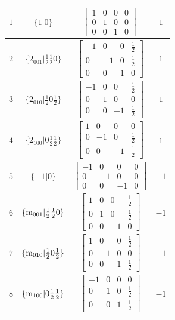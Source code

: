 \documentclass[fleqn,8pt]{jsarticle}
\begin{document}
\begin{longtable}{cccc}
$ 1 $ & $ \{1|0\} $ & $ \begin{bmatrix} 1 & 0 & 0 & 0 \\ 0 & 1 & 0 & 0 \\ 0 & 0 & 1 & 0 \end{bmatrix} $ & $ 1 $ \\ \hline
$ 2 $ & $ \{2{}_{001}|\frac{1}{2} \frac{1}{2} 0\} $ & $ \begin{bmatrix} -1 & 0 & 0 & \frac{1}{2} \\ 0 & -1 & 0 & \frac{1}{2} \\ 0 & 0 & 1 & 0 \end{bmatrix} $ & $ 1 $ \\ \hline
$ 3 $ & $ \{2{}_{010}|\frac{1}{2} 0 \frac{1}{2}\} $ & $ \begin{bmatrix} -1 & 0 & 0 & \frac{1}{2} \\ 0 & 1 & 0 & 0 \\ 0 & 0 & -1 & \frac{1}{2} \end{bmatrix} $ & $ 1 $ \\ \hline
$ 4 $ & $ \{2{}_{100}|0 \frac{1}{2} \frac{1}{2}\} $ & $ \begin{bmatrix} 1 & 0 & 0 & 0 \\ 0 & -1 & 0 & \frac{1}{2} \\ 0 & 0 & -1 & \frac{1}{2} \end{bmatrix} $ & $ 1 $ \\ \hline
$ 5 $ & $ \{-1|0\} $ & $ \begin{bmatrix} -1 & 0 & 0 & 0 \\ 0 & -1 & 0 & 0 \\ 0 & 0 & -1 & 0 \end{bmatrix} $ & $ -1 $ \\ \hline
$ 6 $ & $ \{{\rm m}_{001}|\frac{1}{2} \frac{1}{2} 0\} $ & $ \begin{bmatrix} 1 & 0 & 0 & \frac{1}{2} \\ 0 & 1 & 0 & \frac{1}{2} \\ 0 & 0 & -1 & 0 \end{bmatrix} $ & $ -1 $ \\ \hline
$ 7 $ & $ \{{\rm m}_{010}|\frac{1}{2} 0 \frac{1}{2}\} $ & $ \begin{bmatrix} 1 & 0 & 0 & \frac{1}{2} \\ 0 & -1 & 0 & 0 \\ 0 & 0 & 1 & \frac{1}{2} \end{bmatrix} $ & $ -1 $ \\ \hline
$ 8 $ & $ \{{\rm m}_{100}|0 \frac{1}{2} \frac{1}{2}\} $ & $ \begin{bmatrix} -1 & 0 & 0 & 0 \\ 0 & 1 & 0 & \frac{1}{2} \\ 0 & 0 & 1 & \frac{1}{2} \end{bmatrix} $ & $ -1 $ \\
\end{longtable}
\end{document}
